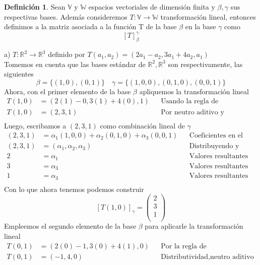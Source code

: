 \documentclass[letterpaper]{article}
\newcommand{\V}{\mathds{V}}
\newcommand{\W}{\mathds{W}}
\newcommand{\R}{\mathds{R}}
\renewcommand{\*}{\cdot}
\theoremstyle{definition}
\newtheorem{definition}{Definición}
\begin{document}
	\begin{definition}
		Sean $ \V $ y $ \W $ espacios vectoriales de dimensión finita y $ \beta, \gamma $ sus respectivas bases. Además consideremos $ T: \V \rightarrow \W $ transformación lineal, entonces definimos a la matriz asociada a la función T de la base $ \beta $ en la base $ \gamma $ como
		\[ [T]_{\beta}^{\gamma} \]
	\end{definition}
		a) $T: \mathbb{R}^{2} \longrightarrow \mathbb{R}^{3}$ definido por $T(a_{1},a_{2}) = (2a_{1} - a_{2}, 3a_{1} + 4a_{2},a_{1})$\\
		Tomemos en cuenta que las bases estándar de $ \R^2, \R^3 $ son respectivamente, las siguientes
		 \[ \beta = \lbrace (1,0),(0,1) \rbrace \quad \gamma = \lbrace (1,0,0),(0,1,0),(0,0,1) \rbrace \]
		Ahora, con el primer elemento de la base $ \beta $ apliquemos la transformación lineal
		\begin{align*}
			T(1,0) &= (2(1) - 0, 3(1) + 4(0), 1 ) && \text{Usando la regla de correspondencia}\\
			T(1,0) &= (2, 3, 1 ) && \text{Por neutro aditivo y multiplicativo}\\
		\end{align*}
		Luego, escribamos a $ (2, 3, 1 ) $ como combinación lineal de $ \gamma $
		\begin{align*}
			(2, 3, 1 ) & = \alpha_1(1,0,0)+ \alpha_2(0,1,0)+ \alpha_3(0,0,1) && \text{Coeficientes en el campo}\\
			(2, 3, 1 ) & = (\alpha_1,\alpha_2,\alpha_3) && \text{Distribuyendo y sumando}\\
			2 & = \alpha_1 && \text{Valores resultantes}\\
			3 & = \alpha_3 && \text{Valores resultantes}\\
			1 & = \alpha_3 && \text{Valores resultantes}\\
		\end{align*}
		Con lo que ahora tenemos podemos construir 
		$$ [T(1,0)]_{\gamma} = \begin{pmatrix}
		2\\
		3 \\
		1 \\
		\end{pmatrix} $$		
		Empleemos el segundo elemento de la base $ \beta $ para aplicarle la transformación lineal 
		\begin{align*}
			T(0,1) &= (2(0) - 1, 3(0) + 4(1), 0) && \text{Por la regla de correspondencia de T}\\
			T(0,1) &= (- 1, 4, 0) && \text{Distributividad,neutro aditivo y multiplicativo}
		\end{align*}
\end{document}
